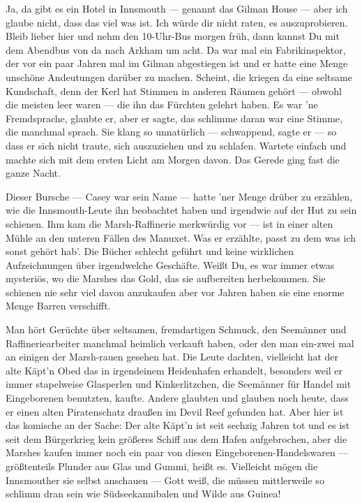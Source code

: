 Ja, da gibt es ein Hotel in Innsmouth --- genannt das Gilman House --- aber ich glaube nicht, dass das viel was ist. Ich würde dir nicht raten, es auszuprobieren. Bleib lieber hier und nehm den 10-Uhr-Bus morgen früh, dann kannst Du mit dem Abendbus von da nach Arkham um acht. Da war mal ein Fabrikinspektor, der vor ein paar Jahren mal im Gilman abgestiegen ist und er hatte eine Menge unschöne Andeutungen darüber zu machen. Scheint, die kriegen da eine seltsame Kundschaft, denn der Kerl hat Stimmen in anderen Räumen gehört --- obwohl die meisten leer waren --- die ihn das Fürchten gelehrt haben. Es war 'ne Fremdsprache, glaubte  er, aber er sagte, das schlimme daran war eine Stimme, die manchmal sprach. Sie klang so unnatürlich --- schwappend, sagte er --- so dass er sich nicht traute, sich auszuziehen und zu schlafen. Wartete einfach und machte sich mit dem ersten Licht am Morgen davon. Das Gerede ging fast die ganze Nacht.

Dieser Bursche --- Casey war sein Name --- hatte 'ner Menge drüber zu erzählen, wie die Innsmouth-Leute ihn beobachtet haben und irgendwie auf der Hut zu sein schienen. Ihm kam die Marsh-Raffinerie merkwürdig vor --- ist in einer alten Mühle an den unteren Fällen des Manuxet. Was er erzählte, passt zu dem was ich sonst gehört hab'. Die Bücher schlecht geführt und keine wirklichen Aufzeichnungen über irgendwelche Geschäfte. Weißt Du, es war immer etwas mysteriös, wo die Marshes das Gold, das sie aufbereiten herbekommen. Sie schienen nie sehr viel davon anzukaufen aber vor Jahren haben sie eine enorme Menge Barren verschifft.

Man hört Gerüchte über seltsamen, fremdartigen Schmuck, den Seemänner und Raffineriearbeiter manchmal heimlich verkauft haben, oder den man ein-zwei mal an einigen der Marsh-rauen gesehen hat. Die Leute dachten, vielleicht hat der alte Käpt'n Obed das in irgendeinem Heidenhafen erhandelt, besonders weil er immer stapelweise Glasperlen und Kinkerlitzchen, die Seemänner für Handel mit Eingeborenen benutzten, kaufte. Andere glaubten und glauben noch heute, dass er einen alten Piratenschatz draußen im Devil Reef gefunden hat. Aber hier ist das komische an der Sache: Der alte Käpt'n ist seit sechzig Jahren tot und es ist seit dem Bürgerkrieg kein größeres Schiff aus dem Hafen aufgebrochen, aber die Marshes kaufen immer noch ein paar von diesen Eingeborenen-Handelswaren --- größtenteils Plunder aus Glas und Gummi, heißt es. Vielleicht mögen die Innsmouther sie selbst anschauen --- Gott weiß, die müssen mittlerweile so schlimm dran sein wie Südseekannibalen und Wilde aus Guinea!

